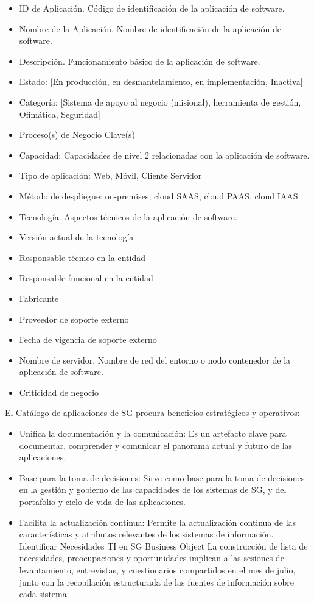 \documentclass[
	a4paper, %
	12pt, %
]{include/CSSullivanBusinessReport}
\def\tightlist{}
\begin{document}
\begin{itemize}
\tightlist
\item
  ID de Aplicación. Código de identificación de la aplicación de
  software.
\item
  Nombre de la Aplicación. Nombre de identificación de la aplicación de
  software.
\item
  Descripción. Funcionamiento básico de la aplicación de software.
\item
  Estado: {[}En producción, en desmantelamiento, en implementación,
  Inactiva{]}
\item
  Categoría: {[}Sistema de apoyo al negocio (misional), herramienta de
  gestión, Ofimática, Seguridad{]}
\item
  Proceso(s) de Negocio Clave(s)
\item
  Capacidad: Capacidades de nivel 2 relacionadas con la aplicación de
  software.
\item
  Tipo de aplicación: Web, Móvil, Cliente Servidor
\item
  Método de despliegue: on-premises, cloud SAAS, cloud PAAS, cloud IAAS
\item
  Tecnología. Aspectos técnicos de la aplicación de software.
\item
  Versión actual de la tecnología
\item
  Responsable técnico en la entidad
\item
  Responsable funcional en la entidad
\item
  Fabricante
\item
  Proveedor de soporte externo
\item
  Fecha de vigencia de soporte externo
\item
  Nombre de servidor. Nombre de red del entorno o nodo contenedor de la
  aplicación de software.
\item
  Criticidad de negocio
\end{itemize}

El Catálogo de aplicaciones de SG procura beneficios estratégicos y
operativos:

\begin{itemize}
\tightlist
\item
  Unifica la documentación y la comunicación: Es un artefacto clave para
  documentar, comprender y comunicar el panorama actual y futuro de las
  aplicaciones.
\item
  Base para la toma de decisiones: Sirve como base para la toma de
  decisiones en la gestión y gobierno de las capacidades de los sistemas
  de SG, y del portafolio y ciclo de vida de las aplicaciones.
\item
  Facilita la actualización continua: Permite la actualización continua
  de las características y atributos relevantes de los sistemas de
  información. \textbar{} \textbar{} Identificar Necesidades TI en SG
  \textbar{} Business Object \textbar{} La construcción de lista de
  necesidades, preocupaciones y oportunidades implican a las sesiones de
  levantamiento, entrevistas, y cuestionarios compartidos en el mes de
  julio, junto con la recopilación estructurada de las fuentes de
  información sobre cada sistema.
\end{itemize}
\end{document}
